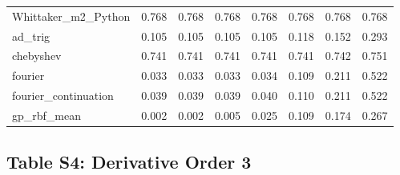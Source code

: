 \documentclass[10pt]{article}
\begin{document}
\begin{longtable}{lrrrrrrr}
Whittaker\_m2\_Python & 0.768 & 0.768 & 0.768 & 0.768 & 0.768 & 0.768 & 0.768 \\
ad\_trig & 0.105 & 0.105 & 0.105 & 0.105 & 0.118 & 0.152 & 0.293 \\
chebyshev & 0.741 & 0.741 & 0.741 & 0.741 & 0.741 & 0.742 & 0.751 \\
fourier & 0.033 & 0.033 & 0.033 & 0.034 & 0.109 & 0.211 & 0.522 \\
fourier\_continuation & 0.039 & 0.039 & 0.039 & 0.040 & 0.110 & 0.211 & 0.522 \\
gp\_rbf\_mean & 0.002 & 0.002 & 0.005 & 0.025 & 0.109 & 0.174 & 0.267 \\
\bottomrule
\end{longtable}

\clearpage

\subsection*{Table S4: Derivative Order 3}
\end{document}
